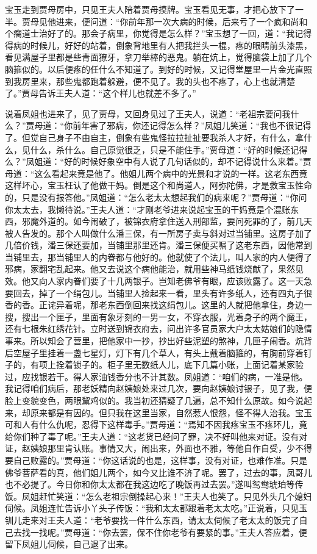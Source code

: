 \begin{parag}
    宝玉走到贾母房中，只见王夫人陪着贾母摸牌。宝玉看见无事，才把心放下了一半。贾母见他进来，便问道：“你前年那一次大病的时候，后来亏了一个疯和尚和个瘸道士治好了的。那会子病里，你觉得是怎么样？”宝玉想了一回，道：“我记得得病的时候儿，好好的站着，倒象背地里有人把我拦头一棍，疼的眼睛前头漆黑，看见满屋子里都是些青面獠牙，拿刀举棒的恶鬼。躺在炕上，觉得脑袋上加了几个脑箍似的。以后便疼的任什么不知道了。到好的时候，又记得堂屋里一片金光直照到我房里来，那些鬼都跑着躲避，便不见了。我的头也不疼了，心上也就清楚了。”贾母告诉王夫人道：“这个样儿也就差不多了。”
\end{parag}


\begin{parag}
    说着凤姐也进来了，见了贾母，又回身见过了王夫人，说道：“老祖宗要问我什么？”贾母道：“你前年害了邪病，你还记得怎么样？”凤姐儿笑道：“我也不很记得了。但觉自己身子不由自主，倒象有些鬼怪拉拉扯扯要我杀人才好，有什么，拿什么，见什么，杀什么。自己原觉很乏，只是不能住手。”贾母道：“好的时候还记得么？”凤姐道：“好的时候好象空中有人说了几句话似的，却不记得说什么来着。”贾母道：“这么看起来竟是他了。他姐儿两个病中的光景和才说的一样。这老东西竟这样坏心，宝玉枉认了他做干妈。倒是这个和尚道人，阿弥陀佛，才是救宝玉性命的，只是没有报答他。”凤姐道：“怎么老太太想起我们的病来呢？”贾母道：“你问你太太去，我懒待说。”王夫人道：“才刚老爷进来说起宝玉的干妈竟是个混账东西，邪魔外道的。如今闹破了，被锦衣府拿住送入刑部监，要问死罪的了，前几天被人告发的。那个人叫做什么潘三保，有一所房子卖与斜对过当铺里。这房子加了几倍价钱，潘三保还要加，当铺里那里还肯。潘三保便买嘱了这老东西，因他常到当铺里去，那当铺里人的内眷都与他好的。他就使了个法儿，叫人家的内人便得了邪病，家翻宅乱起来。他又去说这个病他能治，就用些神马纸钱烧献了，果然见效。他又向人家内眷们要了十几两银子。岂知老佛爷有眼，应该败露了。这一天急要回去，掉了一个绢包儿。当铺里人捡起来一看，里头有许多纸人，还有四丸子很香的香。正诧异着呢，那老东西倒回来找这绢包儿。这里的人就把他拿住，身边一搜，搜出一个匣子，里面有象牙刻的一男一女，不穿衣服，光着身子的两个魔王，还有七根朱红绣花针。立时送到锦衣府去，问出许多官员家大户太太姑娘们的隐情事来。所以知会了营里，把他家中一抄，抄出好些泥塑的煞神，几匣子闹香。炕背后空屋子里挂着一盏七星灯，灯下有几个草人，有头上戴着脑箍的，有胸前穿着钉子的，有项上拴着锁子的。柜子里无数纸人儿，底下几篇小账，上面记着某家验过，应找银若干。得人家油钱香分也不计其数。凤姐道：“咱们的病，一准是他。我记得咱们病后，那老妖精向赵姨娘处来过几次，要向赵姨娘讨银子，见了我，便脸上变貌变色，两眼黧鸡似的。我当初还猜疑了几遍，总不知什么原故。如今说起来，却原来都是有因的。但只我在这里当家，自然惹人恨怨，怪不得人治我。宝玉可和人有什么仇呢，忍得下这样毒手。”贾母道：“焉知不因我疼宝玉不疼环儿，竟给你们种了毒了呢。”王夫人道：“这老货已经问了罪，决不好叫他来对证。没有对证，赵姨娘那里肯认账。事情又大，闹出来，外面也不雅，等他自作自受，少不得要自己败露的。”贾母道：“你这话说的也是，这样事，没有对证，也难作准。只是佛爷菩萨看的真，他们姐儿两个，如今又比谁不济了呢。罢了，过去的事，凤哥儿也不必提了。今日你和你太太都在我这边吃了晚饭再过去罢。”遂叫鸳鸯琥珀等传饭。凤姐赶忙笑道：“怎么老祖宗倒操起心来！”王夫人也笑了。只见外头几个媳妇伺候。凤姐连忙告诉小丫头子传饭：“我和太太都跟着老太太吃。”正说着，只见玉钏儿走来对王夫人道：“老爷要找一件什么东西，请太太伺候了老太太的饭完了自己去找一找呢。”贾母道：“你去罢，保不住你老爷有要紧的事。”王夫人答应着，便留下凤姐儿伺候，自己退了出来。

\end{parag}

